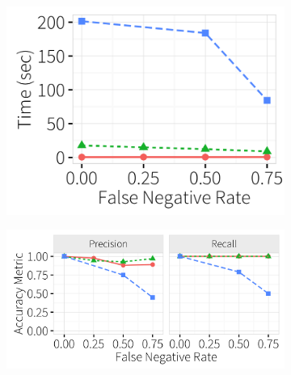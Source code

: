     
\begin{figure}[t]
  \centering
  \begin{minipage}{.49\textwidth}
  \begin{subfigure}[t]{.39\textwidth}
      \includegraphics[width = .99\columnwidth]{figures/noise_fn_time} 
      \vspace*{-.1in}
    \end{subfigure}
    \begin{subfigure}[t]{.59\textwidth}
      \includegraphics[width = .99\columnwidth]{figures/noise_fn_acc}
      \vspace*{-.1in}
    \end{subfigure} \\
      \begin{subfigure}[t]{.99\textwidth}

\end{subfigure}
\end{minipage}
\end{figure}
